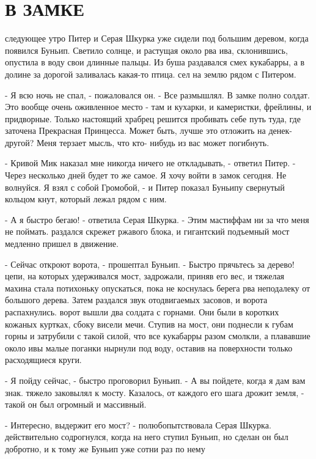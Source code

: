 \chapter{В ЗАМКЕ}
\par{} следующее утро Питер и Серая Шкурка уже сидели под большим 
деревом, когда появился Буньип. Светило солнце, и растущая около рва 
ива, склонившись, опустила в воду свои длинные пальцы. Из буша 
раздавался смех кукабарры, а в долине за дорогой заливалась какая-то 
птица.
 сел на землю рядом с Питером.
\par- Я всю ночь не спал, - пожаловался он. - Все размышлял. В замке 
полно солдат. Это вообще очень оживленное место - там и кухарки, и 
камеристки, фрейлины, и придворные. Только настоящий храбрец решится 
пробивать себе путь туда, где заточена Прекрасная Принцесса. Может 
быть, лучше это отложить на денек-другой? Меня терзает мысль, что кто-
нибудь из вас может погибнуть.
\par- Кривой Мик наказал мне никогда ничего не откладывать, - ответил 
Питер. - Через несколько дней будет то же самое. Я хочу войти в замок 
сегодня. Не волнуйся. Я взял с собой Громобой, - и Питер показал 
Буньипу свернутый кольцом кнут, который лежал рядом с ним.
\par- А я быстро бегаю! - ответила Серая Шкурка. - Этим мастиффам ни 
за что меня не поймать.
 раздался скрежет ржавого блока, и гигантский подъемный мост 
медленно пришел в движение.
\par- Сейчас откроют ворота, - прошептал Буньип. - Быстро прячьтесь за 
дерево!
 цепи, на которых удерживался мост, задрожали, приняв его 
вес, и тяжелая махина стала потихоньку опускаться, пока не коснулась 
берега рва неподалеку от большого дерева. Затем раздался звук 
отодвигаемых засовов, и ворота распахнулись.
 ворот вышли два солдата с горнами. Они были в коротких кожаных 
куртках, сбоку висели мечи. Ступив на мост, они поднесли к губам горны 
и затрубили с такой силой, что все кукабарры разом смолкли, а 
плававшие около ивы малые поганки нырнули под воду, оставив на 
поверхности только расходящиеся круги.
\par- Я пойду сейчас, - быстро проговорил Буньип. - А вы пойдете, 
когда я дам вам знак.
 тяжело заковылял к мосту. Казалось, от каждого его шага дрожит 
земля, - такой он был огромный и массивный.
\par- Интересно, выдержит его мост? - полюбопытствовала Серая Шкурка.
 действительно содрогнулся, когда на него ступил Буньип, но 
сделан он был добротно, и к тому же Буньип уже сотни раз по нему 
